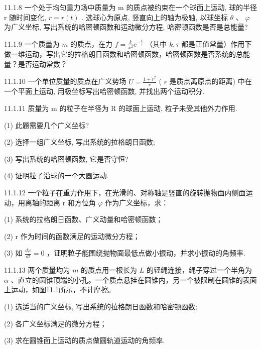 \begin{problem}{11.1.8}
一个处于均匀重力场中质量为 m 的质点被约束在一个球面上运动, 球的半径 r 随时间变化, $r = r(t)$ . 选球心为原点, 竖直向上的轴为极轴, 以球坐标 $\theta$ 、 $\varphi$ 为广义坐标, 写出系统的哈密顿函数和运动微分方程, 哈密顿函数是否是总能量?
\end{problem}
\clearpage


\begin{problem}{11.1.9}
一个质量为 $m$ 的质点，在力 $f = \frac{k}{x^2}\mathrm{e}^{-\frac{t}{\tau}}$ （其中 $k, \tau$ 都是正值常量）作用下做一维运动，写出它的拉格朗日函数和哈密顿函数，哈密顿函数是否系统的总能量？是否运动常数？
\end{problem}
\clearpage


\begin{problem}{11.1.10}
一个单位质量的质点在广义势场 $U = \frac{1 + \dot{r}^2}{r}$ ( $r$ 是质点离原点的距离) 中在一个平面上运动, 用极坐标写出哈密顿函数, 并找出两个运动积分.
\end{problem}
\clearpage


\begin{problem}{11.1.11}
质量为 m 的粒子在半径为 R 的球面上运动, 粒子未受其他外力作用.

(1) 此题需要几个广义坐标?

(2) 选择一组广义坐标, 写出系统的拉格朗日函数;

(3) 写出系统的哈密顿函数, 它是否守恒?

(4) 证明粒子沿球的一个大圆运动.
\end{problem}
\clearpage


\begin{problem}{11.1.12}
一个粒子在重力作用下，在光滑的、对称轴是竖直的旋转抛物面内侧面运动，用离轴的距离 r 和方位角 $\varphi$ 作为广义坐标，求：

(1) 系统的拉格朗日函数、广义动量和哈密顿函数；

(2) r 作为时间的函数满足的运动微分方程；

(3) 如 $\frac{d\varphi}{dt}=0$ ，证明粒子能围绕抛物面最低点做小振动，并求小振动的角频率.
\end{problem}
\clearpage


\begin{problem}{11.1.13}
两个质量均为 $m$ 的质点用一根长为 $L$ 的轻绳连接，绳子穿过一个半角为 $\alpha$ 、直立的圆锥顶端的小孔。一个质点悬挂在圆锥内，另一个被限制在圆锥的表面上运动，如图11.1所示，不计摩擦。

(1) 选适当的广义坐标, 写出系统的拉格朗日函数和哈密顿函数;

(2) 各广义坐标满足的微分方程；

(3) 求在圆锥面上运动的质点做圆轨道运动的角频率.
\begin{center}

\end{center}
\end{problem}
\clearpage


